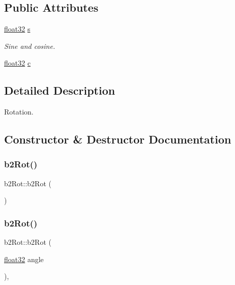 \subsection*{Public Attributes}
\begin{DoxyCompactItemize}
\item 
\mbox{\hyperlink{b2_settings_8h_aacdc525d6f7bddb3ae95d5c311bd06a1}{float32}} \mbox{\hyperlink{structb2_rot_a15725ce0a89cc735ad90687b4c0f4dce}{s}}
\begin{DoxyCompactList}\small\item\em Sine and cosine. \end{DoxyCompactList}\item 
\mbox{\hyperlink{b2_settings_8h_aacdc525d6f7bddb3ae95d5c311bd06a1}{float32}} \mbox{\hyperlink{structb2_rot_af23e5d31889dcb806ce46ce55aa81261}{c}}
\end{DoxyCompactItemize}


\subsection{Detailed Description}
Rotation. 

\subsection{Constructor \& Destructor Documentation}
\mbox{\label{structb2_rot_a8cabd61f7e293b67748640fa5aa19841}} 
\subsubsection{\texorpdfstring{b2Rot()}{b2Rot()}\hspace{0.1cm}{\footnotesize\ttfamily [1/2]}}
{\footnotesize\ttfamily b2\+Rot\+::b2\+Rot (\begin{DoxyParamCaption}{ }\end{DoxyParamCaption})\hspace{0.3cm}{\ttfamily [inline]}}

\mbox{\label{structb2_rot_aa40dda6d390a2f54c793c63027a9b46e}} 
\subsubsection{\texorpdfstring{b2Rot()}{b2Rot()}\hspace{0.1cm}{\footnotesize\ttfamily [2/2]}}
{\footnotesize\ttfamily b2\+Rot\+::b2\+Rot (\begin{DoxyParamCaption}\item[{\mbox{\hyperlink{b2_settings_8h_aacdc525d6f7bddb3ae95d5c311bd06a1}{float32}}}]{angle }\end{DoxyParamCaption})\hspace{0.3cm}{\ttfamily [inline]}, {\ttfamily [explicit]}}



